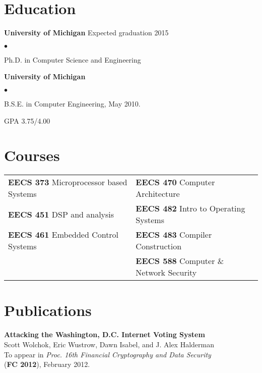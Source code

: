 \documentclass{res}
\newcommand{\sqitem}{\item[\tiny$\blacksquare$]}
\newcommand{\sqlist}{\begin{list}{$\bullet$}
  { \setlength{\itemsep}{0pt}
	\setlength{\parsep}{0pt}
	\setlength{\topsep}{0pt}
	\setlength{\partopsep}{0pt}
	\setlength{\leftmargin}{6.0em}
	\setlength{\labelsep}{2.5em} } }
\newcommand{\sqend}{\end{list}}
\begin{document}

\address{\emph{Current Address}	\\
			1010 Cedar Bend	\\
			Ann Arbor, MI 48105			\\
										\\
			phone: 734.330.8702			\\
			email: ewust@umich.edu}

\begin{resume}

\section{Education}
	\textbf{University of Michigan}  Expected graduation 2015%
	\sqlist	
		\sqitem Ph.D. in Computer Science and Engineering 
	\sqend

	\textbf{University of Michigan}
	\sqlist
		\sqitem B.S.E. in Computer Engineering, May 2010.
		\sqitem GPA 3.75/4.00
	\sqend

\section{Courses}
	\begin{tabular}{l l}
	\textbf{EECS 373} Microprocessor based Systems & 
					\textbf{EECS 470} Computer Architecture \\
	\textbf{EECS 451} DSP and analysis & 
					\textbf{EECS 482} Intro to Operating Systems \\
	\textbf{EECS 461} Embedded Control Systems & 
					\textbf{EECS 483} Compiler Construction \\
											  &
					\textbf{EECS 588} Computer \& Network Security \\
	\end{tabular}
\fi

\section{Publications}

    \textbf{Attacking the Washington, D.C. Internet Voting System} \\
    Scott Wolchok, Eric Wustrow, Dawn Isabel, and J. Alex Halderman \\
    To appear in \emph{Proc. 16th Financial Cryptography and Data Security} \\
    (\textbf{FC 2012}), February 2012.


\end{resume}
\end{document}

